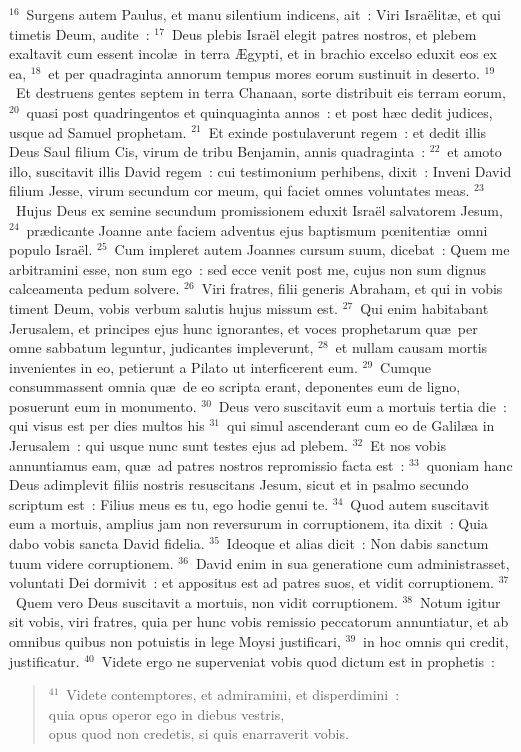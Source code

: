 ${}^{16}$~Surgens autem Paulus, et manu silentium indicens, ait~: Viri Isra\"elit\ae , et qui timetis Deum, audite~:
${}^{17}$~Deus plebis Isra\"el elegit patres nostros, et plebem exaltavit cum essent incol\ae\ in terra \AE gypti, et in brachio excelso eduxit eos ex ea,
${}^{18}$~et per quadraginta annorum tempus mores eorum sustinuit in deserto.
${}^{19}$~Et destruens gentes septem in terra Chanaan, sorte distribuit eis terram eorum,
${}^{20}$~quasi post quadringentos et quinquaginta annos~: et post h\ae c dedit judices, usque ad Samuel prophetam.
${}^{21}$~Et exinde postulaverunt regem~: et dedit illis Deus Saul filium Cis, virum de tribu Benjamin, annis quadraginta~:
${}^{22}$~et amoto illo, suscitavit illis David regem~: cui testimonium perhibens, dixit~: Inveni David filium Jesse, virum secundum cor meum, qui faciet omnes voluntates meas.
${}^{23}$~Hujus Deus ex semine secundum promissionem eduxit Isra\"el salvatorem Jesum,
${}^{24}$~pr\ae dicante Joanne ante faciem adventus ejus baptismum pœnitenti\ae\ omni populo Isra\"el.
${}^{25}$~Cum impleret autem Joannes cursum suum, dicebat~: Quem me arbitramini esse, non sum ego~: sed ecce venit post me, cujus non sum dignus calceamenta pedum solvere.
${}^{26}$~Viri fratres, filii generis Abraham, et qui in vobis timent Deum, vobis verbum salutis hujus missum est.
${}^{27}$~Qui enim habitabant Jerusalem, et principes ejus hunc ignorantes, et voces prophetarum qu\ae\ per omne sabbatum leguntur, judicantes impleverunt,
${}^{28}$~et nullam causam mortis invenientes in eo, petierunt a Pilato ut interficerent eum.
${}^{29}$~Cumque consummassent omnia qu\ae\ de eo scripta erant, deponentes eum de ligno, posuerunt eum in monumento.
${}^{30}$~Deus vero suscitavit eum a mortuis tertia die~: qui visus est per dies multos his
${}^{31}$~qui simul ascenderant cum eo de Galil\ae a in Jerusalem~: qui usque nunc sunt testes ejus ad plebem.
${}^{32}$~Et nos vobis annuntiamus eam, qu\ae\ ad patres nostros repromissio facta est~:
${}^{33}$~quoniam hanc Deus adimplevit filiis nostris resuscitans Jesum, sicut et in psalmo secundo scriptum est~: Filius meus es tu, ego hodie genui te.
${}^{34}$~Quod autem suscitavit eum a mortuis, amplius jam non reversurum in corruptionem, ita dixit~: Quia dabo vobis sancta David fidelia.
${}^{35}$~Ideoque et alias dicit~: Non dabis sanctum tuum videre corruptionem.
${}^{36}$~David enim in sua generatione cum administrasset, voluntati Dei dormivit~: et appositus est ad patres suos, et vidit corruptionem.
${}^{37}$~Quem vero Deus suscitavit a mortuis, non vidit corruptionem.
${}^{38}$~Notum igitur sit vobis, viri fratres, quia per hunc vobis remissio peccatorum annuntiatur, et ab omnibus quibus non potuistis in lege Moysi justificari,
${}^{39}$~in hoc omnis qui credit, justificatur.
${}^{40}$~Videte ergo ne superveniat vobis quod dictum est in prophetis~:
\begin{flushleft}\begin{verse}${}^{41}$~Videte contemptores, et admiramini, et disperdimini~:\\ quia opus operor ego in diebus vestris,\\ opus quod non credetis, si quis enarraverit vobis.\end{verse}\end{flushleft}


